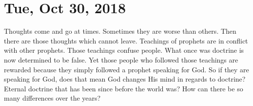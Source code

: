 \section{Tue, Oct 30, 2018}

Thoughts come and go at times. Sometimes they are worse than others. Then there are
those thoughts which cannot leave. Teachings of prophets are in conflict with other
prophets. Those teachings confuse people. What once was doctrine is now determined to
be false. Yet those people who followed those teachings are rewarded because they
simply followed a prophet speaking for God. So if they are speaking for God, does
that mean God changes His mind in regards to doctrine? Eternal doctrine that has been
since before the world was? How can there be so many differences over the years?